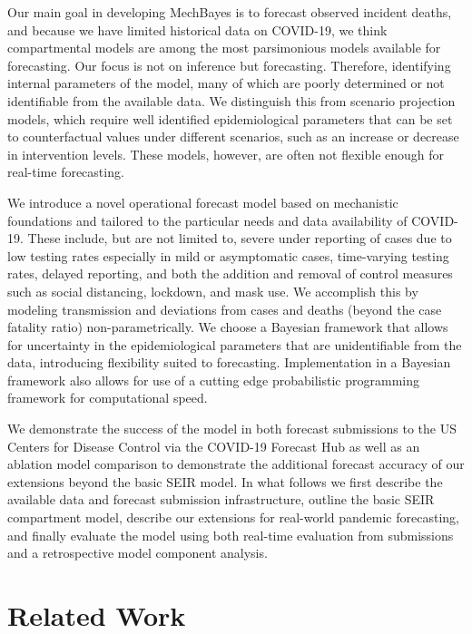 \documentclass[11pt]{amsart}
\begin{document}
 
 Our main goal in developing MechBayes is to forecast observed incident deaths, and because we have limited historical data on COVID-19, we think compartmental models are among the most parsimonious models available for forecasting. Our focus is not on inference but forecasting. Therefore, identifying internal parameters of the model, many of which are poorly determined or not identifiable from the available data. We distinguish this from scenario projection models, which require well identified epidemiological parameters that can be set to counterfactual values under different scenarios, such as an increase or decrease in intervention levels. These models, however, are often not flexible enough for real-time forecasting. 
 
We introduce a novel operational forecast model based on mechanistic foundations and tailored to the particular needs and data availability of COVID-19. These include, but are not limited to, severe under reporting of cases due to low testing rates especially in mild or asymptomatic cases, time-varying testing rates, delayed reporting, and both the addition and removal of control measures such as social distancing, lockdown, and mask use. We accomplish this by modeling transmission and deviations from cases and deaths (beyond the case fatality ratio) non-parametrically.  We choose a Bayesian framework that allows for uncertainty in the epidemiological parameters that are unidentifiable from the data, introducing flexibility suited to forecasting. Implementation in a Bayesian framework also allows for use of a cutting edge probabilistic programming framework for computational speed. 


 We demonstrate the success of the model in both forecast submissions to the US Centers for Disease Control via the COVID-19 Forecast Hub as well as an ablation model comparison to demonstrate the additional forecast accuracy of our extensions beyond the basic SEIR model. In what follows we first describe the available data and forecast submission infrastructure, outline the basic SEIR compartment model, describe our extensions for real-world pandemic forecasting, and finally evaluate the model using both real-time evaluation from submissions and a retrospective model component analysis. 



\section{Related Work}
\end{document}
